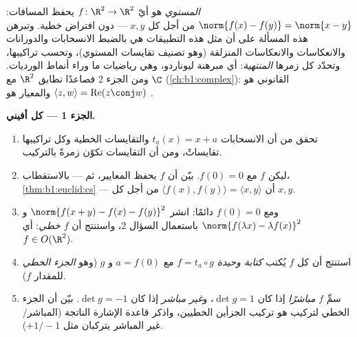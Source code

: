 \begin{problem}\label{pb:b1:euclid:1}
\emph{ المستوي} هو أيّ  $f \colon \R^2 \to
\R^2$ يحفظ المسافات: $\norm{f(x) - f(y)} = \norm{x - y}$
من أجل كل $x, y$ --- دون افتراض خطية. وتبرهن هذه المسألة
على أن مثل هذه التطبيقات هي بالضبط الانسحابات والدورانات
والانعكاسات والانعكاسات المنزلقة (وهو تصنيف تقايسات
المستوي)، وتحسب تراكيبها، وتحدّد كل
زمرها \emph{المنتهية}: أي مبرهنة ليوناردو، وهي رياضيات
ما وراء أنماط الورديات. ومن الجزء 2 فصاعدًا نطابق $\R^2$ مع
$\C$ (\cref{ch:b1:complex}):  القانوني هو
$\langle z, w\rangle = \operatorname{Re}(z\conj w)$ والمعيار
هو .

\medskip
\noindent\textbf{الجزء 1 --- كل  أفيني.}
\begin{enumerate}
  \item تحقق من أن الانسحابات $t_a(x) = x + a$ والتقايسات
        الخطية وكل تراكيبها تقايساتٌ،
        ومن أن التقايسات تكوّن زمرةً بالتركيب.
  \item ليكن $f$  مع $f(0) = 0$. بيّن أن $f$
        يحفظ المعايير، ثم --- بالاستقطاب،
        \cref{thm:b1:euclid:cs} --- أن $\langle f(x),
        f(y)\rangle = \langle x, y\rangle$ من أجل كل $x, y$.
  \item ومع $f(0) = 0$ دائمًا: انشر $\norm{f(x + y) - f(x) -
        f(y)}^2$ و $\norm{f(\lambda x) - \lambda f(x)}^2$
        باستعمال السؤال 2، واستنتج أن $f$
        \emph{خطي}: أي $f \in O(\R^2)$.
  \item استنتج أن كل  $f$ يُكتب \emph{كتابة وحيدة}
        $f = t_a \circ g$ مع $a = f(0)$ و $g$ 
         (وهو \emph{الجزء الخطي} للمقدار $f$).
  \item سمِّ $f$ \emph{مباشرًا} إذا كان $\det g = 1$، و\emph{غير مباشر}
        إذا كان $\det g = -1$. بيّن أن الجزء الخطي لتركيب
        هو تركيب الجزأين الخطيين، واذكر
        قاعدة الإشارة الناتجة
        (المباشر/غير المباشر يتركبان مثل $+1/-1$).
\end{enumerate}


\end{problem}
